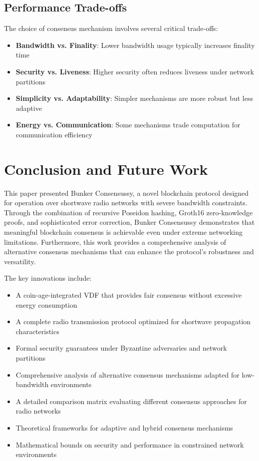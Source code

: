 \documentclass[11pt,a4paper]{article}
\begin{document}
\subsection{Performance Trade-offs}

The choice of consensus mechanism involves several critical trade-offs:

\begin{itemize}
\item \textbf{Bandwidth vs. Finality}: Lower bandwidth usage typically increases finality time
\item \textbf{Security vs. Liveness}: Higher security often reduces liveness under network partitions  
\item \textbf{Simplicity vs. Adaptability}: Simpler mechanisms are more robust but less adaptive
\item \textbf{Energy vs. Communication}: Some mechanisms trade computation for communication efficiency
\end{itemize}

\section{Conclusion and Future Work}

This paper presented Bunker Consensussy, a novel blockchain protocol designed for operation over shortwave radio networks with severe bandwidth constraints. Through the combination of recursive Poseidon hashing, Groth16 zero-knowledge proofs, and sophisticated error correction, Bunker Consensussy demonstrates that meaningful blockchain consensus is achievable even under extreme networking limitations. Furthermore, this work provides a comprehensive analysis of alternative consensus mechanisms that can enhance the protocol's robustness and versatility.

The key innovations include:
\begin{itemize}
\item A coin-age-integrated VDF that provides fair consensus without excessive energy consumption
\item A complete radio transmission protocol optimized for shortwave propagation characteristics
\item Formal security guarantees under Byzantine adversaries and network partitions
\item Comprehensive analysis of alternative consensus mechanisms adapted for low-bandwidth environments
\item A detailed comparison matrix evaluating different consensus approaches for radio networks
\item Theoretical frameworks for adaptive and hybrid consensus mechanisms
\item Mathematical bounds on security and performance in constrained network environments
\end{itemize}
\end{document}
